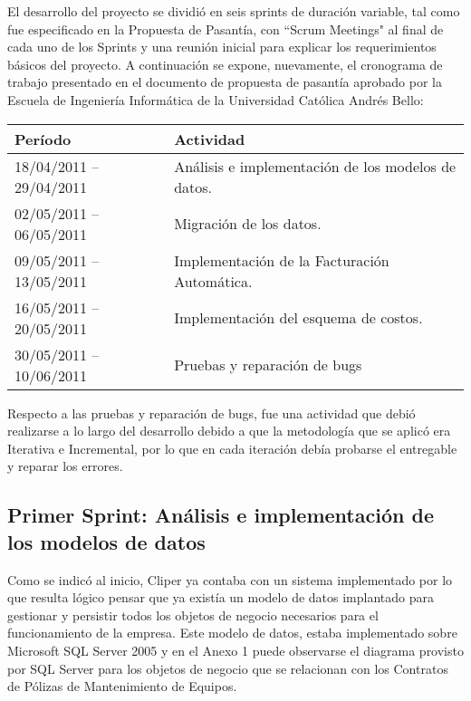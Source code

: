 \documentclass[a4paper, 12pt]{article}
\begin{document}
El desarrollo del proyecto se dividió en seis sprints de duración variable, tal como fue especificado en la Propuesta de Pasantía, con ``Scrum Meetings" al final de cada uno de los Sprints y una reunión inicial para explicar los requerimientos básicos del proyecto. A continuación se expone, nuevamente, el cronograma de trabajo presentado en el documento de propuesta de pasantía aprobado por la Escuela de Ingeniería Informática de la Universidad Católica Andrés Bello:

\begin{center}
    \begin{tabular}{ | p{5cm} | p{9cm} | }
        \hline
        \textbf{Período} & \textbf{Actividad} \\ \hline
        18/04/2011 – 29/04/2011 & Análisis e implementación de los modelos de datos. \\ \hline
        02/05/2011 – 06/05/2011 & Migración de los datos. \\ \hline
        09/05/2011 – 13/05/2011 & Implementación de la Facturación Automática. \\ \hline
        16/05/2011 – 20/05/2011 & Implementación del esquema de costos. \\ \hline
        30/05/2011 – 10/06/2011 & Pruebas y reparación de bugs \\ \hline
    \end{tabular}
\end{center}

Respecto a las pruebas y reparación de bugs, fue una actividad que debió realizarse a lo largo del desarrollo debido a que la metodología que se aplicó era Iterativa e Incremental, por lo que en cada iteración debía probarse el entregable y reparar los errores.

\subsection{Primer Sprint: Análisis e implementación de los modelos de datos}
Como se indicó al inicio, Cliper ya contaba con un sistema implementado por lo que resulta lógico pensar que ya existía un modelo de datos implantado para gestionar y persistir todos los objetos de negocio necesarios para el funcionamiento de la empresa. Este modelo de datos, estaba implementado sobre Microsoft SQL Server 2005 y en el Anexo 1 puede observarse el diagrama provisto por SQL Server para los objetos de negocio que se relacionan con los Contratos de Pólizas de Mantenimiento de Equipos.
\end{document}
